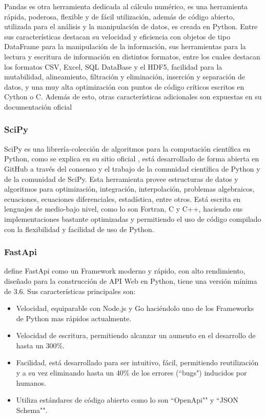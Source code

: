 Pandas es otra herramienta dedicada al cálculo numérico, es una herramienta
rápida, poderosa, flexible y de fácil utilización, además de código abierto,
utilizada para el análisis y la manipulación de datos, es creada en Python.
Entre sus características destacan su velocidad y eficiencia con objetos de
tipo DataFrame para la manipulación de la información, sus herramientas para la
lectura y escritura de información en distintos formatos, entre los cuales
destacan los formatos CSV, Excel, SQL DataBase y el HDF5, facilidad para la
mutabilidad, alineamiento, filtración y eliminación, inserción y separación de
datos, y una muy alta optimización con puntos de código críticos escritos en
Cython o C. Además de esto, otras características adicionales son expuestas en
su documentación oficial \textcite{PandasDocs}

\subsubsection{SciPy}
SciPy es una librería-colección de algoritmos para la computación científica en
Python, como se explica en su sitio oficial \textcite{Scipy}, está desarrollado de
forma abierta en GitHub a través del consenso y el trabajo de la comunidad
científica de Python y de la comunidad de SciPy. Esta herramienta provee estructuras
de datos y
algoritmos para optimización, integración, interpolación, problemas algebraicos,
ecuaciones, ecuaciones diferenciales, estadística, entre otros. Está escrita
en lenguajes de medio-bajo nivel, como lo son Fortran, C y C++, haciendo sus
implementaciones bastante optimizadas y permitiendo el uso de código compilado
con la flexibilidad y facilidad de uso de Python.

\subsubsection{FastApi}
\textcite{FastApi} define FastApi como un Framework moderno y rápido, con alto
rendimiento, diseñado para
la construcción de API Web en Python, tiene una versión mínima de 3.6. Sus
características principales son:

\begin{itemize}
    \item Velocidad, equiparable con Node.js y Go haciéndolo
uno de los Frameworks de Python mas rápidos actualmente.
    \item Velocidad de escritura, permitiendo alcanzar un aumento en el desarrollo
        de hasta un 300\%.
    \item Facilidad, está desarrollado para ser intuitivo, fácil, permitiendo
        reutilización y a su vez eliminando hasta un 40\% de los errores (``bugs")
        inducidos por humanos.
    \item Utiliza estándares de código abierto como lo son ``OpenApi"" y ``JSON Schema"".
\end{itemize}

